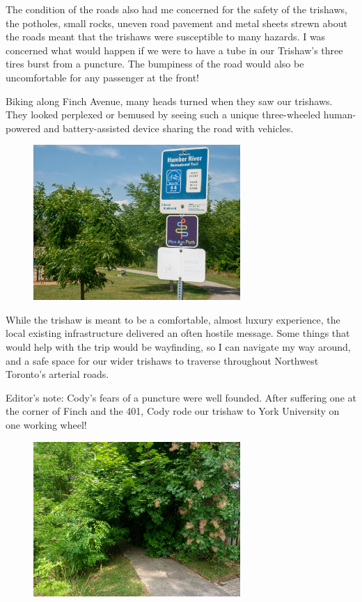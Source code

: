 \documentclass[letter]{ourGreenwayBrand}
\begin{document}
The condition of the roads also had me concerned for the safety of the trishaws, the potholes, small rocks, uneven road pavement and metal sheets strewn about the roads meant that the trishaws were susceptible to many hazards. I was concerned what would happen if we were to have a tube in our Trishaw’s three tires burst from a puncture. The bumpiness of the road would also be uncomfortable for any passenger at the front!

Biking along Finch Avenue, many heads turned when they saw our trishaws. They looked perplexed or bemused by seeing such a unique three-wheeled human-powered and battery-assisted device sharing the road with vehicles.

\begin{figure}[htbp]
  \centering
  \includegraphics[width=0.7\textwidth]{images/1220563-2048x1538.jpg}
\end{figure}

While the trishaw is meant to be a comfortable, almost luxury experience, the local existing infrastructure delivered an often hostile message. Some things that would help with the trip would be wayfinding, so I can navigate my way around, and a safe space for our wider trishaws to traverse throughout Northwest Toronto’s arterial roads.

Editor’s note: Cody’s fears of a puncture were well founded. After suffering one at the corner of Finch and the 401, Cody rode our trishaw to York University on one working wheel!

\begin{figure}[htbp]
  \centering
  \includegraphics[width=0.7\textwidth]{images/1220507-2048x1538.jpg}
\end{figure}
\end{document}
